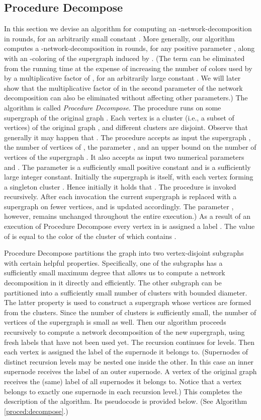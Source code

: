 \documentclass[11pt]{article}
\begin{document}
\subsection{Procedure Decompose} \label{sc:decompose}
In this section we devise an algorithm for computing an -network-decomposition in  rounds, for an arbitrarily small constant .  More generally, our algorithm computes a -network-decomposition   in  rounds, for any positive parameter , along with an -coloring  of the supergraph induced by . (The  term can be eliminated from the running time at the expense of increasing the number of colors used by  by a multiplicative factor of , for an arbitrarily large constant . We will later show that the multiplicative factor of  in the second parameter of the network decomposition can also be eliminated without affecting other parameters.)  The algorithm is called {\em Procedure Decompose}. 
The procedure runs on some supergraph  of the original graph . Each vertex   is a cluster (i.e., a subset of vertices) of the original graph , and different clusters are disjoint. Observe that generally it may happen that . The procedure accepts as input the supergraph , the number of vertices  of , the parameter , and an upper bound  on the number of vertices of the supergraph . It also accepts as input two numerical parameters  and . The parameter  is a sufficiently small positive constant and  is a sufficiently large integer constant. Initially the supergraph is  itself, with each vertex  forming a singleton cluster . Hence initially it holds that .
The procedure is invoked recursively. After each invocation the current  supergraph  is replaced with a supergraph on fewer vertices, and  is updated accordingly. The parameter , however, remains unchanged throughout the entire execution.) As a result of an execution of Procedure Decompose every vertex  in  is assigned a label . The value of  is equal to the color  of the cluster  of  which contains .

Procedure Decompose partitions the graph  into two vertex-disjoint subgraphs with certain helpful properties. Specifically, one of the subgraphs has a sufficiently small maximum degree that allows us to compute a network decomposition in it directly and efficiently. The other subgraph can be partitioned into a sufficiently small number of clusters with bounded diameter. The latter property is used to construct a supergraph whose vertices are formed from the clusters. Since the number of clusters is sufficiently small, the number of vertices of the supergraph is small as well. Then our algorithm proceeds recursively to compute a network decomposition of the new supergraph, using fresh labels that have not been used yet. The recursion continues for  levels. Then each vertex is assigned the label of the supernode it belongs to. (Supernodes of distinct recursion levels may be nested one inside the other. In this case an inner supernode receives the label of an outer supernode. A vertex of the original graph  receives the (same) label of all supernodes it belongs to. Notice that a vertex belongs to exactly one supernode in each recursion level.) This completes the description of the algorithm. Its pseudocode is provided below. (See Algorithm \ref{proced:decompose}.)
\end{document}

